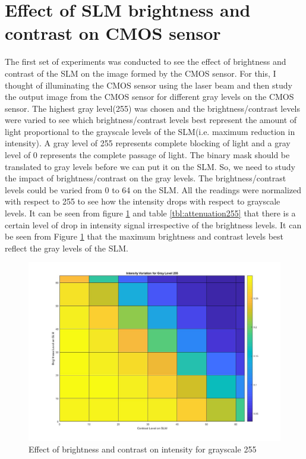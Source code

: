 \section{Effect of SLM brightness and contrast on CMOS sensor}
The first set of experiments was conducted to see the effect of brightness and contrast of the SLM on the image formed by the CMOS sensor. For this, I thought of illuminating the CMOS sensor using the laser beam and then study the output image from the CMOS sensor for different gray levels on the CMOS sensor. The highest gray level(255) was chosen and the brightness/contrast levels were varied to see which brightness/contrast levels best represent the amount of light proportional to the grayscale levels of the SLM(i.e. maximum reduction in intensity). A gray level of 255 represents complete blocking of light and a gray level of 0 represents the complete passage of light. The binary mask should be translated to gray levels before we can put it on the SLM. So, we need to study the impact of brightness/contrast on the gray levels. The brightness/contrast levels could be varied from 0 to 64 on the SLM. All the readings were normalized with respect to 255 to see how the intensity drops with respect to grayscale levels. It can be seen from figure \ref{fig:slm_grayscale255} and table \ref{tbl:attenuation255} that there is a certain level of drop in intensity signal irrespective of the brightness levels. It can be seen from Figure \ref{fig:slm_grayscale255} that the maximum brightness and contrast levels best reflect the gray levels of the SLM. 

\begin{figure}[htbp]
\centering
\includegraphics[width = \linewidth]{pics/slm/slmgrayscale255.jpg}
\caption{Effect of brightness and contrast on intensity for grayscale 255}
\label{fig:slm_grayscale255}
\end{figure}


